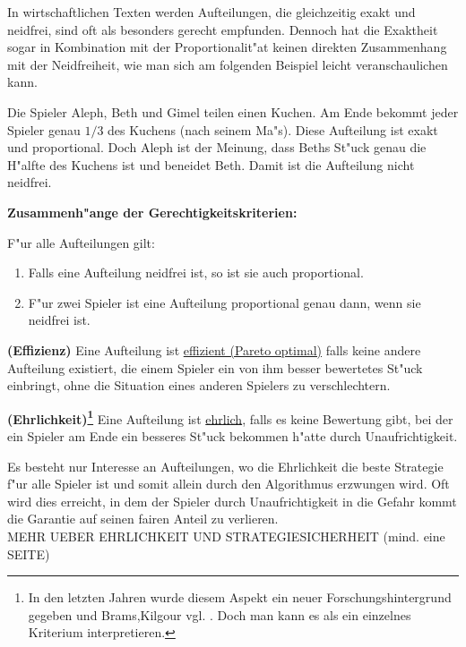 In wirtschaftlichen Texten werden Aufteilungen, die gleichzeitig exakt und
neidfrei, sind oft als besonders gerecht empfunden. Dennoch hat die Exaktheit
sogar in Kombination mit der Proportionalit"at keinen direkten Zusammenhang mit
der Neidfreiheit, wie man sich am folgenden Beispiel leicht veranschaulichen
kann.\\
\begin{bsp}Die Spieler Aleph, Beth und Gimel teilen einen Kuchen. Am Ende
bekommt jeder Spieler genau $1/3$ des Kuchens (nach seinem Ma"s). Diese
Aufteilung ist exakt und proportional. Doch Aleph ist der Meinung, dass Beths
St"uck genau die H"alfte des Kuchens ist und beneidet Beth. Damit ist die
Aufteilung nicht neidfrei.\end{bsp}
\textbf{Zusammenh"ange der Gerechtigkeitskriterien:}
\begin{lem}
F"ur alle Aufteilungen gilt:
\begin{enumerate}
\item Falls eine Aufteilung neidfrei ist, so ist sie auch proportional.
\item F"ur zwei Spieler ist eine Aufteilung proportional genau dann, wenn sie
neidfrei ist.
\end{enumerate}
\end{lem}
\begin{defi}{\textbf{(Effizienz)}}
\newline Eine Aufteilung ist \underline{effizient (Pareto optimal)} falls keine
andere Aufteilung existiert, die einem Spieler ein von ihm besser bewertetes
St"uck einbringt, ohne die Situation eines anderen Spielers zu verschlechtern.
\end{defi}
\begin{defi}{\textbf{(Ehrlichkeit)\footnote{In den letzten Jahren wurde diesem
Aspekt ein  neuer Forschungshintergrund gegeben und Brams,Kilgour vgl.
\cite{23}. Doch man kann es als ein einzelnes Kriterium interpretieren.}}}
\newline Eine Aufteilung ist \underline{ehrlich}, falls es keine Bewertung gibt,
bei der ein Spieler am Ende ein besseres St"uck bekommen h"atte durch
Unaufrichtigkeit.
\end{defi}
Es besteht nur Interesse an Aufteilungen, wo die Ehrlichkeit die beste Strategie
f"ur alle Spieler ist und somit allein durch den Algorithmus erzwungen wird. Oft
wird dies erreicht, in dem der Spieler durch Unaufrichtigkeit in die Gefahr
kommt die Garantie auf seinen fairen Anteil zu verlieren.\\
\newpage
MEHR UEBER EHRLICHKEIT UND STRATEGIESICHERHEIT (mind. eine SEITE)
